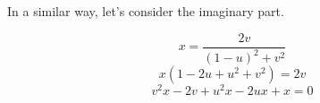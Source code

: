In a similar way, let's consider the imaginary part.

\begin{equation*}
x = \frac{2v}{{(1 - u)}^2 + v^2}
\end{equation*}
\begin{equation*}
x(1 - 2u + u^2 + v^2) = 2v
\end{equation*}
\begin{equation*}
v^2x - 2v + u^2x - 2ux + x = 0
\end{equation*}



